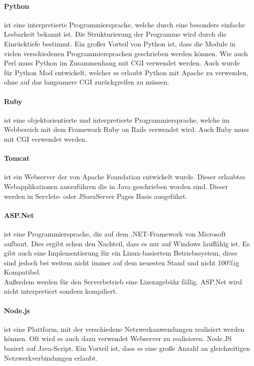 \paragraph{Python}
 ist eine interpretierte Programmiersprache, welche durch eine besonders einfache Lesbarkeit bekannt ist. Die Strukturierung der Programme wird durch die Einrücktiefe bestimmt. Ein großer Vorteil von Python ist, dass die Module in vielen verschiedenen Programmiersprachen geschrieben werden können. Wie auch Perl muss Python im Zusammenhang mit CGI verwendet werden. Auch wurde für Python Mod entwickelt, welcher es erlaubt Python mit Apache zu verwenden, ohne auf das langsamere CGI zurückgreifen zu müssen.\\
\paragraph{Ruby}
 ist eine objektorientierte und interpretierte Programmiersprache, welche im Webbereich mit dem Framework Ruby on Rails verwendet wird. Auch Ruby muss mit CGI verwendet werden.
\paragraph{Tomcat}
 ist ein Webserver der von Apache Foundation entwickelt wurde. Dieser erlaubtes Webapplikationen auszuführen die in Java geschrieben worden sind. Dieser werden in Servlets- oder JSavaServer Pages Basis ausgeführt.
\paragraph{ASP.Net}
 ist eine Programmiersprache, die auf dem .NET-Framework von Microsoft aufbaut. Dies ergibt schon den Nachteil, dass es nur auf Windows lauffähig ist. Es gibt auch eine Implementierung für ein Linux-basiertem Betriebssystem, diese sind jedoch bei weitem nicht immer auf dem neuesten Stand und nicht 100\%ig Kompatibel.\\
Außerdem werden für den Serverbetrieb eine Lizenzgebühr fällig. ASP.Net wird nicht interpretiert sondern kompiliert.
\paragraph{Node.js}
 ist eine Plattform, mit der verschiedene Netzwerkanwendungen realisiert werden können. Oft wird es auch dazu verwendet Webserver zu realisieren. Node.JS basiert auf Java-Script. Ein Vorteil ist, dass es eine große Anzahl an gleichzeitigen Netzwerkverbindungen erlaubt.